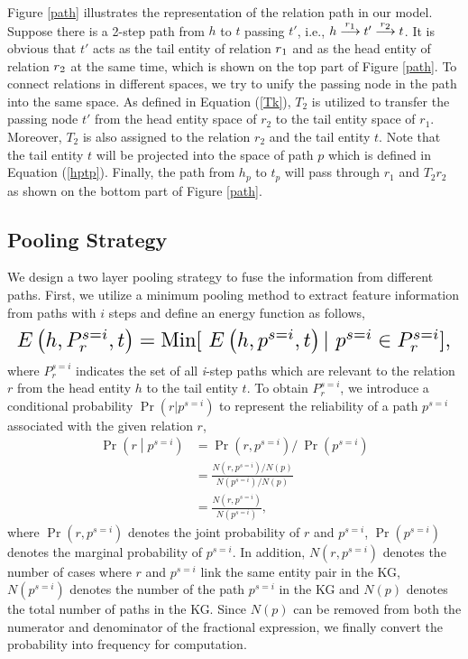\documentclass[11pt,a4paper]{article}
\begin{document}
Figure \ref{path} illustrates the representation of the relation
path in our model. Suppose there is a 2-step path from ${h}$ to
${t}$ passing ${t'}$, i.e., ${h}\stackrel{
{r\textsubscript{1}}}{\longrightarrow}{t'}\stackrel{
{r\textsubscript{2}}}{\longrightarrow}{t}$. It is obvious that
${t'}$ acts as the tail entity of relation ${r\textsubscript{1}}$
and as the head entity of relation ${r\textsubscript{2}}$ at the
same time, which is shown on the top part of Figure \ref{path}. To
connect relations in different spaces, we try to unify the passing
node in the path into the same space. As defined in Equation
(\ref{Tk}), $T_{2}$ is utilized to transfer the passing node $t'$
from the head entity space of $r_{2}$ to the tail entity space of
$r_{1}$. Moreover, $T_{2}$ is also assigned to the relation $r_{2}$
and the tail entity $t$. Note that the tail entity $t$ will be
projected into the space of path $p$ which is defined in Equation
(\ref{hptp}). Finally, the path from $h_{p}$ to $t_{p}$ will pass
through $r_{1}$ and $T_{2}r_{2}$ as shown on the bottom part of
Figure \ref{path}.


\subsection{Pooling Strategy}
We design a two layer pooling strategy to fuse the information from
different paths. First, we utilize a minimum pooling method to
extract feature information from paths with $i$ steps and define an
energy function as follows,
\begin{equation}
\resizebox{1\linewidth}{!}{$ E\left( h,P^{s = i}_{r},t \right) =
\textrm{Min}\lbrack\ E\left( h,p^{s = i},t \right)|\ p^{s = i} \in
P^{s = i}_{r}\rbrack,$}
\end{equation}
where \(P^{s = i}_{r}\) indicates the set of all \emph{i}-step
paths which are relevant to the relation ${r}$  from the head entity ${h}$ to the tail entity ${t}$. To obtain \(P^{s = i}_{r}\), we introduce a conditional probability
\(\Pr(r|p^{s = i})\) to represent the reliability of a path \(p^{s =
i}\) associated with the given relation ${r}$,
\begin{equation}
\begin{split}
\Pr\left( r \middle| p^{s = i} \right) & = \Pr(r,p^{s = i})/\ \Pr(p^{s
= i}) \\
& = \frac{N(r, p^{s=i}) / N(p)}{N(p^{s=i}) / N(p)} \\
& = \frac{N(r, p^{s=i})}{N(p^{s=i})},
\end{split}
\end{equation}
where $\Pr(r,p^{s = i})$ denotes the joint probability of $r$ and
$p^{s = i}$, $\Pr(p^{s = i})$ denotes the marginal probability of
$p^{s = i}$. In addition, $N(r, p^{s=i})$ denotes the number of cases where $r$ and $p^{s=i}$ link the same entity pair in the KG, $N(p^{s=i})$ denotes the number of the path $p^{s=i}$ in the KG and $N(p)$ denotes the total number of paths in the KG. Since $N(p)$ can be removed from both the numerator and denominator of the fractional expression, we finally convert the probability into frequency for computation.
\end{document}
